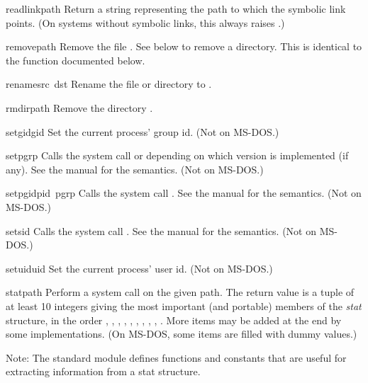 \begin{funcdesc}{readlink}{path}
Return a string representing the path to which the symbolic link
points.  (On systems without symbolic links, this always raises
.)
\end{funcdesc}

\begin{funcdesc}{remove}{path}
Remove the file .  See  below to remove a
directory.  This is identical to the  function
documented below.
\end{funcdesc}

\begin{funcdesc}{rename}{src\, dst}
Rename the file or directory  to .
\end{funcdesc}

\begin{funcdesc}{rmdir}{path}
Remove the directory .
\end{funcdesc}

\begin{funcdesc}{setgid}{gid}
Set the current process' group id.
(Not on MS-DOS.)
\end{funcdesc}

\begin{funcdesc}{setpgrp}{}
Calls the system call  or  depending on which version is implemented (if any).  See the
\UNIX{} manual for the semantics.
(Not on MS-DOS.)
\end{funcdesc}

\begin{funcdesc}{setpgid}{pid\, pgrp}
Calls the system call .  See the \UNIX{} manual
for the semantics.
(Not on MS-DOS.)
\end{funcdesc}

\begin{funcdesc}{setsid}{}
Calls the system call .  See the \UNIX{} manual
for the semantics.
(Not on MS-DOS.)
\end{funcdesc}

\begin{funcdesc}{setuid}{uid}
Set the current process' user id.
(Not on MS-DOS.)
\end{funcdesc}

\begin{funcdesc}{stat}{path}
Perform a  system call on the given path.  The
return value is a tuple of at least 10 integers giving the most
important (and portable) members of the \emph{stat} structure, in the
order
,
,
,
,
,
,
,
,
,
.
More items may be added at the end by some implementations.
(On MS-DOS, some items are filled with dummy values.)

Note: The standard module  defines
functions and constants that are useful for extracting information
from a stat structure.
\end{funcdesc}

